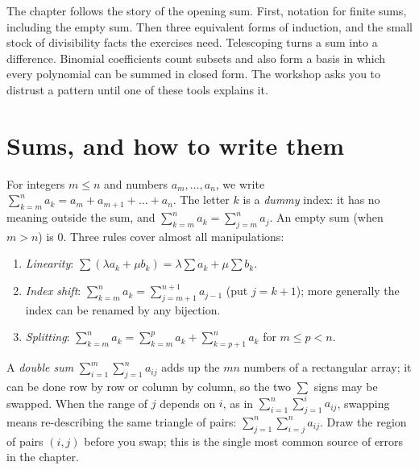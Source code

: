 The chapter follows the story of the opening sum. First, notation for finite sums, including the empty sum. Then three equivalent forms of induction, and the small stock of divisibility facts the exercises need. Telescoping turns a sum into a difference. Binomial coefficients count subsets and also form a basis in which every polynomial can be summed in closed form. The workshop asks you to distrust a pattern until one of these tools explains it.


\section{Sums, and how to write them}

\begin{reminder}
For integers $m\le n$ and numbers $a_m,\dots,a_n$, we write $\sum_{k=m}^na_k=a_m+a_{m+1}+\dots+a_n$. The letter $k$ is a \emph{dummy} index: it has
no meaning outside the sum, and $\sum_{k=m}^na_k=\sum_{j=m}^na_j$. An empty sum (when $m>n$) is $0$. Three rules cover almost all manipulations:
\begin{enumerate}[label=(\roman*)]
\item \emph{Linearity}: $\sum(\lambda a_k+\mu b_k)=\lambda\sum a_k+\mu\sum b_k$.
\item \emph{Index shift}: $\sum_{k=m}^na_k=\sum_{j=m+1}^{n+1}a_{j-1}$ (put $j=k+1$); more generally the index can be renamed by any bijection.
\item \emph{Splitting}: $\sum_{k=m}^na_k=\sum_{k=m}^pa_k+\sum_{k=p+1}^na_k$ for $m\le p<n$.
\end{enumerate}
A \emph{double sum} $\sum_{i=1}^m\sum_{j=1}^na_{ij}$ adds up the $mn$ numbers of a rectangular array; it can be done row by row or column by column,
so the two $\sum$ signs may be swapped. When the range of $j$ depends on $i$, as in $\sum_{i=1}^n\sum_{j=1}^ia_{ij}$, swapping means re-describing the
same triangle of pairs: $\sum_{j=1}^n\sum_{i=j}^na_{ij}$. Draw the region of pairs $(i,j)$ before you swap; this is the single most common source of
errors in the chapter.
\end{reminder}

